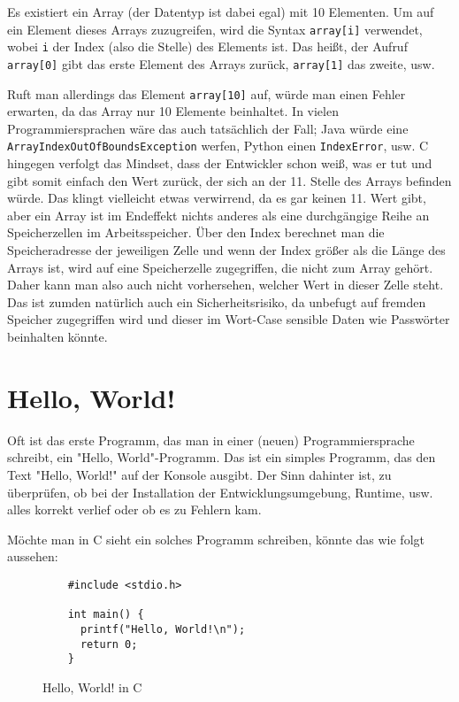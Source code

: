 \documentclass[11pt]{article}
\begin{document}
\begin{bsp}
  Es existiert ein Array (der Datentyp ist dabei egal) mit 10 Elementen. Um auf ein Element dieses Arrays zuzugreifen,
  wird die Syntax \texttt{array[i]} verwendet, wobei \texttt{i} der Index (also die Stelle) des Elements ist. Das heißt,
  der Aufruf \texttt{array[0]} gibt das erste Element des Arrays zurück, \texttt{array[1]} das zweite, usw.

  Ruft man allerdings das Element \texttt{array[10]} auf, würde man einen Fehler erwarten, da das Array nur 10 Elemente
  beinhaltet. In vielen Programmiersprachen wäre das auch tatsächlich der Fall; Java würde eine \texttt{ArrayIndexOutOfBoundsException}
  werfen, Python einen \texttt{IndexError}, usw. C hingegen verfolgt das Mindset, dass der Entwickler schon weiß, was er
  tut und gibt somit einfach den Wert zurück, der sich an der 11. Stelle des Arrays befinden würde. Das klingt vielleicht
  etwas verwirrend, da es gar keinen 11. Wert gibt, aber ein Array ist im Endeffekt nichts anderes als eine durchgängige
  Reihe an Speicherzellen im Arbeitsspeicher. Über den Index berechnet man die Speicheradresse der jeweiligen Zelle und
  wenn der Index größer als die Länge des Arrays ist, wird auf eine Speicherzelle zugegriffen, die nicht zum Array gehört.
  Daher kann man also auch nicht vorhersehen, welcher Wert in dieser Zelle steht. Das ist zumden natürlich auch ein
  Sicherheitsrisiko, da unbefugt auf fremden Speicher zugegriffen wird und dieser im Wort-Case sensible Daten wie Passwörter
  beinhalten könnte.
\end{bsp}

\section{Hello, World!}
Oft ist das erste Programm, das man in einer (neuen) Programmiersprache schreibt, ein "Hello, World"-Programm. Das ist
ein simples Programm, das den Text "Hello, World!" auf der Konsole ausgibt. Der Sinn dahinter ist, zu überprüfen, ob bei
der Installation der Entwicklungsumgebung, Runtime, usw. alles korrekt verlief oder ob es zu Fehlern kam.

\newpage
Möchte man in C sieht ein solches Programm schreiben, könnte das wie folgt aussehen:
\begin{figure}[h!]
  \ignorespaces
  \begin{verbatim}
    #include <stdio.h>

    int main() {
      printf("Hello, World!\n");
      return 0;
    }
  \end{verbatim}
  \caption{Hello, World! in C}
  \label{fig:hello-world}
\end{figure}
\end{document}
